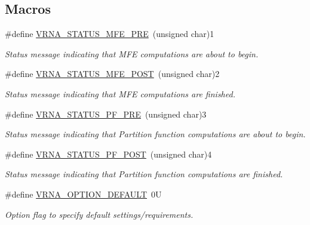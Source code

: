 \subsection*{Macros}
\begin{DoxyCompactItemize}
\item 
\#define \mbox{\hyperlink{group__fold__compound_ga1a5053dc8acbb0111e852988726f07d6}{V\+R\+N\+A\+\_\+\+S\+T\+A\+T\+U\+S\+\_\+\+M\+F\+E\+\_\+\+P\+RE}}~(unsigned char)1
\begin{DoxyCompactList}\small\item\em Status message indicating that M\+FE computations are about to begin. \end{DoxyCompactList}\item 
\#define \mbox{\hyperlink{group__fold__compound_ga47c900ca76e56e59e2e83a06e0bde641}{V\+R\+N\+A\+\_\+\+S\+T\+A\+T\+U\+S\+\_\+\+M\+F\+E\+\_\+\+P\+O\+ST}}~(unsigned char)2
\begin{DoxyCompactList}\small\item\em Status message indicating that M\+FE computations are finished. \end{DoxyCompactList}\item 
\#define \mbox{\hyperlink{group__fold__compound_ga91795d35ebdb6f32be50459f24b3d114}{V\+R\+N\+A\+\_\+\+S\+T\+A\+T\+U\+S\+\_\+\+P\+F\+\_\+\+P\+RE}}~(unsigned char)3
\begin{DoxyCompactList}\small\item\em Status message indicating that Partition function computations are about to begin. \end{DoxyCompactList}\item 
\#define \mbox{\hyperlink{group__fold__compound_ga1c6fa243533fd026e50f7d595eaaa565}{V\+R\+N\+A\+\_\+\+S\+T\+A\+T\+U\+S\+\_\+\+P\+F\+\_\+\+P\+O\+ST}}~(unsigned char)4
\begin{DoxyCompactList}\small\item\em Status message indicating that Partition function computations are finished. \end{DoxyCompactList}\item 
\mbox{\label{group__fold__compound_gacea5b7ee6181c485f36e2afa0e9089e4}} 
\#define \mbox{\hyperlink{group__fold__compound_gacea5b7ee6181c485f36e2afa0e9089e4}{V\+R\+N\+A\+\_\+\+O\+P\+T\+I\+O\+N\+\_\+\+D\+E\+F\+A\+U\+LT}}~0U
\begin{DoxyCompactList}\small\item\em Option flag to specify default settings/requirements. \end{DoxyCompactList}\item 

\end{DoxyCompactItemize}

